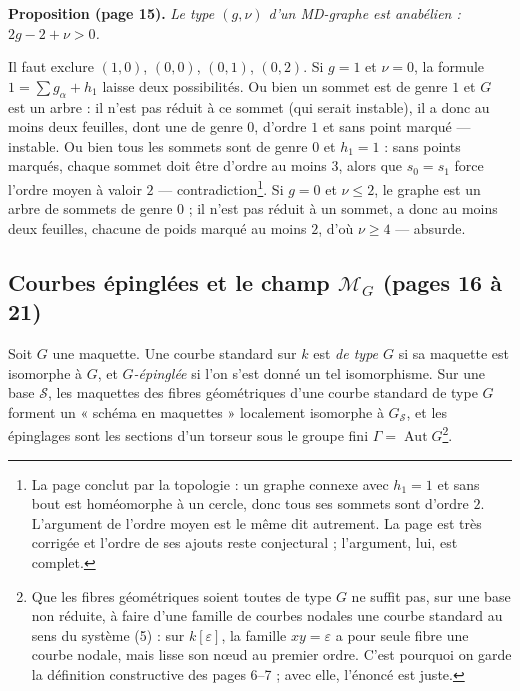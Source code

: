 \documentclass[11pt,a4paper]{article}
\begin{document}
\textbf{Proposition (page 15).} \emph{Le type $(g, \nu)$ d'un MD-graphe est
anabélien : $2g - 2 + \nu > 0$.}

Il faut exclure $(1, 0)$, $(0, 0)$, $(0, 1)$, $(0, 2)$. Si $g = 1$ et $\nu = 0$,
la formule $1 = \sum g_\alpha + h_1$ laisse deux possibilités. Ou bien un sommet
est de genre $1$ et $G$ est un arbre : il n'est pas réduit à ce sommet (qui serait
instable), il a donc au moins deux feuilles, dont une de genre $0$, d'ordre $1$
et sans point marqué — instable. Ou bien tous les sommets sont de genre $0$ et
$h_1 = 1$ : sans points marqués, chaque sommet doit être d'ordre au moins $3$,
alors que $s_0 = s_1$ force l'ordre moyen à valoir $2$ — contradiction\footnote{La
page conclut par la topologie : un graphe connexe avec $h_1 = 1$ et sans bout
est homéomorphe à un cercle, donc tous ses sommets sont d'ordre $2$. L'argument
de l'ordre moyen est le même dit autrement. La page est très corrigée et l'ordre
de ses ajouts reste conjectural ; l'argument, lui, est complet.}. Si $g = 0$ et
$\nu \leq 2$, le graphe est un arbre de sommets de genre $0$ ; il n'est pas
réduit à un sommet, a donc au moins deux feuilles, chacune de poids marqué au
moins $2$, d'où $\nu \geq 4$ — absurde.

\subsection*{Courbes épinglées et le champ $\mathcal{M}_G$ (pages 16 à 21)}

Soit $G$ une maquette. Une courbe standard sur $k$ est \emph{de type $G$} si sa
maquette est isomorphe à $G$, et \emph{$G$-épinglée} si l'on s'est donné un tel
isomorphisme. Sur une base $\mathcal{S}$, les maquettes des fibres géométriques
d'une courbe standard de type $G$ forment un « schéma en maquettes » localement
isomorphe à $G_{\mathcal{S}}$, et les épinglages sont les sections d'un torseur
sous le groupe fini $\Gamma = \operatorname{Aut} G$\footnote{Que les fibres
géométriques soient toutes de type $G$ ne suffit pas, sur une base non réduite, à
faire d'une famille de courbes nodales une courbe standard au sens du système
(5) : sur $k[\varepsilon]$, la famille $xy = \varepsilon$ a pour seule fibre une
courbe nodale, mais lisse son nœud au premier ordre. C'est pourquoi on garde la
définition constructive des pages 6--7 ; avec elle, l'énoncé est juste.}.
\end{document}

